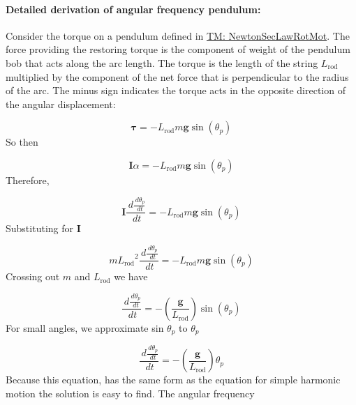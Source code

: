 \documentclass[12pt]{article}
\begin{document}
\paragraph{Detailed derivation of angular frequency pendulum:}
\label{GD:angFrequencyGDDeriv}
Consider the torque on a pendulum defined in \hyperref[TM:NewtonSecLawRotMot]{TM: NewtonSecLawRotMot}. The force providing the restoring torque is the component of weight of the pendulum bob that acts along the arc length. The torque is the length of the string ${L_{\text{rod}}}$ multiplied by the component of the net force that is perpendicular to the radius of the arc. The minus sign indicates the torque acts in the opposite direction of the angular displacement:

\begin{displaymath}
\mathbf{τ}=-{L_{\text{rod}}} m \mathbf{g} \sin\left({θ_{p}}\right)
\end{displaymath}
So then

\begin{displaymath}
\mathbf{I} α=-{L_{\text{rod}}} m \mathbf{g} \sin\left({θ_{p}}\right)
\end{displaymath}
Therefore,

\begin{displaymath}
\mathbf{I} \frac{\,d\frac{\,d{θ_{p}}}{\,dt}}{\,dt}=-{L_{\text{rod}}} m \mathbf{g} \sin\left({θ_{p}}\right)
\end{displaymath}
Substituting for $\mathbf{I}$

\begin{displaymath}
m {L_{\text{rod}}}^{2} \frac{\,d\frac{\,d{θ_{p}}}{\,dt}}{\,dt}=-{L_{\text{rod}}} m \mathbf{g} \sin\left({θ_{p}}\right)
\end{displaymath}
Crossing out $m$ and ${L_{\text{rod}}}$ we have

\begin{displaymath}
\frac{\,d\frac{\,d{θ_{p}}}{\,dt}}{\,dt}=-\left(\frac{\mathbf{g}}{{L_{\text{rod}}}}\right) \sin\left({θ_{p}}\right)
\end{displaymath}
For small angles, we approximate sin ${θ_{p}}$ to ${θ_{p}}$

\begin{displaymath}
\frac{\,d\frac{\,d{θ_{p}}}{\,dt}}{\,dt}=-\left(\frac{\mathbf{g}}{{L_{\text{rod}}}}\right) {θ_{p}}
\end{displaymath}
Because this equation, has the same form as the equation for simple harmonic motion the solution is easy to find.  The angular frequency
\end{document}
